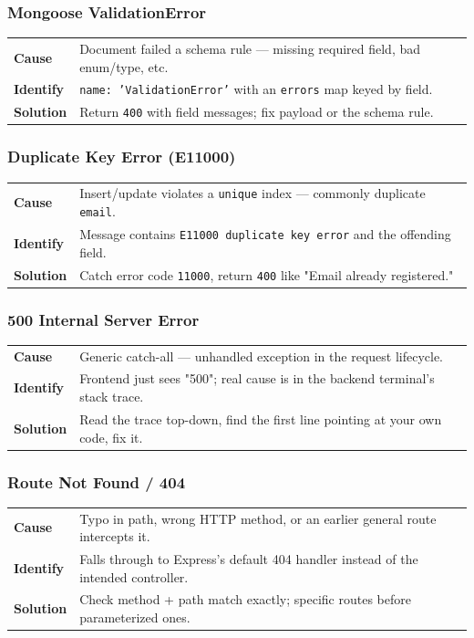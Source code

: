 \subsubsection*{Mongoose ValidationError}
\noindent\begin{tabularx}{\textwidth}{@{}>{\bfseries}p{2.3cm}X@{}}
\toprule
Cause & Document failed a schema rule --- missing required field, bad enum/type, etc. \\
Identify & \texttt{name: 'ValidationError'} with an \texttt{errors} map keyed by field. \\
Solution & Return \texttt{400} with field messages; fix payload or the schema rule. \\
\bottomrule
\end{tabularx}

\subsubsection*{Duplicate Key Error (E11000)}
\noindent\begin{tabularx}{\textwidth}{@{}>{\bfseries}p{2.3cm}X@{}}
\toprule
Cause & Insert/update violates a \texttt{unique} index --- commonly duplicate \texttt{email}. \\
Identify & Message contains \texttt{E11000 duplicate key error} and the offending field. \\
Solution & Catch error code \texttt{11000}, return \texttt{400} like "Email already registered." \\
\bottomrule
\end{tabularx}

\subsubsection*{500 Internal Server Error}
\noindent\begin{tabularx}{\textwidth}{@{}>{\bfseries}p{2.3cm}X@{}}
\toprule
Cause & Generic catch-all --- unhandled exception in the request lifecycle. \\
Identify & Frontend just sees "500"; real cause is in the backend terminal's stack trace. \\
Solution & Read the trace top-down, find the first line pointing at your own code, fix it. \\
\bottomrule
\end{tabularx}

\subsubsection*{Route Not Found / 404}
\noindent\begin{tabularx}{\textwidth}{@{}>{\bfseries}p{2.3cm}X@{}}
\toprule
Cause & Typo in path, wrong HTTP method, or an earlier general route intercepts it. \\
Identify & Falls through to Express's default 404 handler instead of the intended controller. \\
Solution & Check method + path match exactly; specific routes before parameterized ones. \\
\bottomrule
\end{tabularx}

